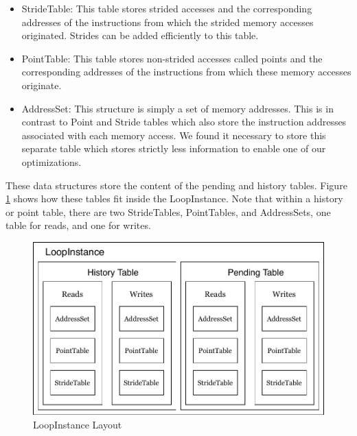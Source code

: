 \documentclass[12pt,twoside]{reedthesis}
\begin{document}
			\begin{itemize}
				\item StrideTable: This table stores strided accesses and the corresponding addresses of the instructions from which the strided memory accesses originated. Strides can be added efficiently to this table.
				\item PointTable: This table stores non-strided accesses called points and the corresponding addresses of the instructions from which these memory accesses originate. 
				\item AddressSet: This structure is simply a set of memory addresses.
				This is in contrast to Point and Stride tables which also store the instruction addresses associated with each memory access. We found it necessary to store this separate table which stores strictly less information to enable one of our optimizations. %
			\end{itemize}
		
			These data structures store the content of the pending and history tables. Figure \ref{fig:loopinstance} shows how these tables fit inside the LoopInstance. Note that within a history or point table, there are two StrideTables, PointTables, and AddressSets, one table for reads, and one for writes.%
			
			\begin{figure}[H]
				\caption{LoopInstance Layout}
				\label{fig:loopinstance}
				\includegraphics[scale=0.7]{loop-instance.pdf}
			\end{figure}
			
\end{document}
